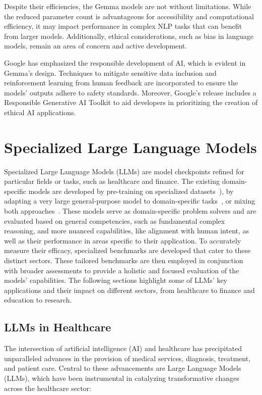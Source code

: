 Despite their efficiencies, the Gemma models are not without limitations.
While the reduced parameter count is advantageous for accessibility and computational efficiency, it may impact performance in complex NLP tasks that can benefit from larger models.
Additionally, ethical considerations, such as bias in language models, remain an area of concern and active development.

Google has emphasized the responsible development of AI, which is evident in Gemma's design.
Techniques to mitigate sensitive data inclusion and reinforcement learning from human feedback are incorporated to ensure the models' outputs adhere to safety standards.
Moreover, Google's release includes a Responsible Generative AI Toolkit to aid developers in prioritizing the creation of ethical AI applications.


\section{Specialized Large Language Models}
\label{sec:applications-of-large-language-models}

Specialized Large Language Models (LLMs) are model checkpoints refined for particular fields or tasks, such as healthcare and finance.
The existing domain-specific models are developed by pre-training on specialized datasets~\cite{luo2022biogpt,bolton2023biomedlm, taylor2022galactica}), by adapting a very large general-purpose model to domain-specific tasks~\cite{singhal2022large, liang2022holistic}, or mixing both approaches~\cite{wu2023bloomberggpt}.
These models serve as domain-specific problem solvers and are evaluated based on general competencies, such as fundamental complex reasoning, and more nuanced capabilities, like alignment with human intent, as well as their performance in areas specific to their application.
To accurately measure their efficacy, specialized benchmarks are developed that cater to these distinct sectors.
These tailored benchmarks are then employed in conjunction with broader assessments to provide a holistic and focused evaluation of the models' capabilities.
The following sections highlight some of LLMs' key applications and their impact on different sectors, from healthcare to finance and education to research.

\subsection{LLMs in Healthcare}
\label{subsec:llms-in-healthcare}
The intersection of artificial intelligence (AI) and healthcare has precipitated unparalleled advances in the provision of medical services, diagnosis, treatment, and patient care.
Central to these advancements are Large Language Models (LLMs), which have been instrumental in catalyzing transformative changes across the healthcare sector:

